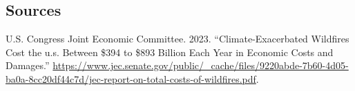 \documentclass[
  12pt,
  letterpaper,
  DIV=11,
  numbers=noendperiod]{scrartcl}
\newlength{\cslhangindent}
\newenvironment{CSLReferences}[2] %
 {\begin{list}{}{%
  \setlength{\itemindent}{0pt}
  \setlength{\leftmargin}{0pt}
  \setlength{\parsep}{0pt}
  \ifodd #1
   \setlength{\leftmargin}{\cslhangindent}
   \setlength{\itemindent}{-1\cslhangindent}
  \fi
  \setlength{\itemsep}{#2\baselineskip}}}
 {\end{list}}
\begin{document}
\subsection*{Sources}\label{sources}

\label{refs}
\begin{CSLReferences}{1}{0}
U.S. Congress Joint Economic Committee. 2023. {``Climate-Exacerbated
Wildfires Cost the u.s. Between \$394 to \$893 Billion Each Year in
Economic Costs and Damages.''}
\url{https://www.jec.senate.gov/public/_cache/files/9220abde-7b60-4d05-ba0a-8cc20df44c7d/jec-report-on-total-costs-of-wildfires.pdf}.

\end{CSLReferences}
\end{document}
